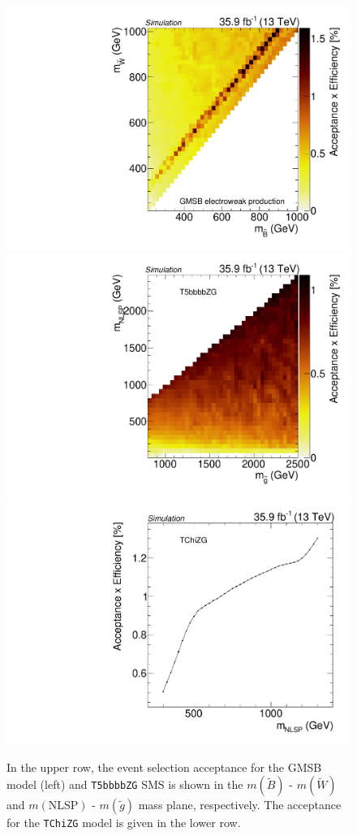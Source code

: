 \begin{figure}
 \centering
 \includegraphics[width=\pairwidth]{figures/acceptance/gmsb}
 \includegraphics[width=\pairwidth]{figures/acceptance/t5zg}
 \includegraphics[width=\pairwidth]{figures/acceptance/tching}
 \caption{In the upper row, the event selection acceptance for the GMSB model (left) and \texttt{T5bbbbZG} SMS is shown in the $m(\widetilde{B})$ - $m(\widetilde{W})$ and $m(\mathrm{NLSP})$ - $m(\tilde{g})$ mass plane, respectively. The acceptance for the \texttt{TChiZG} model is given in the lower row.}
 \label{fig:app_acceptance}
\end{figure}
\FloatBarrier

